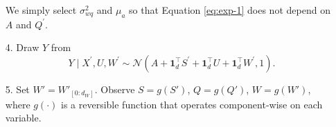 \begin{itemize}
We simply select $\sigma_{w q}^2$ and $\mu_a$ so that Equation \eqref{eq:exp-1} does not depend on $A$ and $Q^{\prime}$.
\item[4.] Draw $Y$ from
$$
Y \mid X^{\prime}, U, W^{\prime} \sim \mathcal{N}\left(A+\mathbf{1}_d^{\top} S^{\prime}+\mathbf{1}_d^{\top} U+\mathbf{1}_d^{\top} W^{\prime}, 1\right) .
$$
\item[5.] Set $W' = W'_{[0:d_W]}$. Observe $S = g(S')$, $Q = g(Q')$, $W = g(W')$, where $g(\cdot)$ is a reversible function that operates component-wise on each variable.  
\end{itemize}
